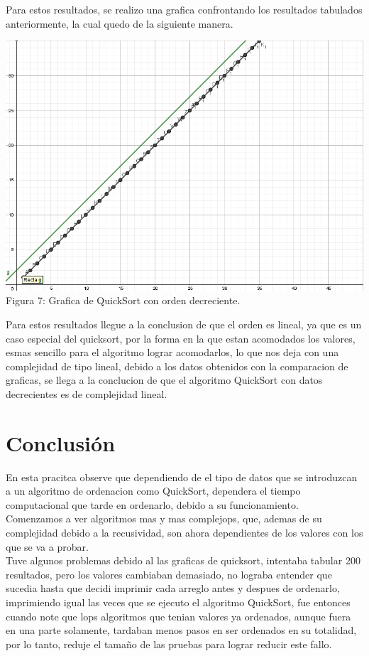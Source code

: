 \documentclass[spanish]{article}
\begin{document}
\newpage
	Para estos resultados, se realizo una grafica confrontando los resultados tabulados anteriormente, la cual quedo de la siguiente manera.\\
	\begin{center}
		\includegraphics[scale=.5]{./imagenes/qsDec.png}\\
		Figura 7: Grafica de QuickSort con orden decreciente.
	\end{center}
	Para estos resultados llegue a la conclusion de que el orden es lineal, ya que es un caso especial del quicksort, por la forma en la que estan acomodados los valores, esmas sencillo para el algoritmo lograr acomodarlos, lo que nos deja con una complejidad de tipo lineal, debido a los datos obtenidos con la comparacion de graficas, se llega a la conclucion de que el algoritmo QuickSort con datos decrecientes es de complejidad lineal.
		
	\bigskip

	\newpage

	\bigskip

	\section{Conclusi\'on}

	\bigskip
En esta pracitca observe que dependiendo de el tipo de datos que se introduzcan a un algoritmo de ordenacion como QuickSort, dependera el tiempo computacional que tarde en ordenarlo, debido a su funcionamiento.\\Comenzamos a ver algoritmos mas y mas complejops, que, ademas de su complejidad debido a la recusividad, son ahora dependientes de los valores con los que se va a  probar.\\Tuve algunos problemas debido al las graficas de quicksort, intentaba tabular 200 resultados, pero los valores cambiaban demasiado, no lograba entender que sucedia hasta que decidi imprimir cada arreglo antes y despues de ordenarlo, imprimiendo igual las veces que se ejecuto el algoritmo QuickSort, fue entonces cuando note que lops algoritmos que tenian valores ya ordenados, aunque fuera en una parte solamente, tardaban menos pasos en ser ordenados en su totalidad, por lo tanto, reduje el tamaño de las pruebas para lograr reducir este fallo.
\end{document}

